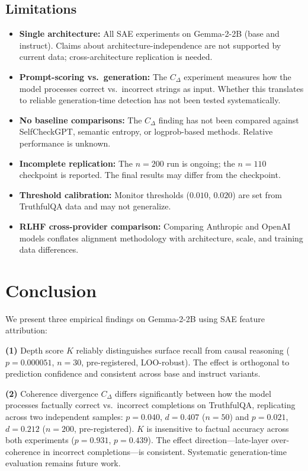 \documentclass[10pt]{article}
\begin{document}
\subsection{Limitations}

\begin{itemize}
    \item \textbf{Single architecture:} All SAE experiments on Gemma-2-2B (base and instruct). Claims about architecture-independence are not supported by current data; cross-architecture replication is needed.
    \item \textbf{Prompt-scoring vs.\ generation:} The $C_{\Delta}$ experiment measures how the model processes correct vs.\ incorrect strings as input. Whether this translates to reliable generation-time detection has not been tested systematically.
    \item \textbf{No baseline comparisons:} The $C_{\Delta}$ finding has not been compared against SelfCheckGPT, semantic entropy, or logprob-based methods. Relative performance is unknown.
    \item \textbf{Incomplete replication:} The $n{=}200$ run is ongoing; the $n{=}110$ checkpoint is reported. The final results may differ from the checkpoint.
    \item \textbf{Threshold calibration:} Monitor thresholds ($0.010$, $0.020$) are set from TruthfulQA data and may not generalize.
    \item \textbf{RLHF cross-provider comparison:} Comparing Anthropic and OpenAI models conflates alignment methodology with architecture, scale, and training data differences.
\end{itemize}

\section{Conclusion}

We present three empirical findings on Gemma-2-2B using SAE feature attribution:

\textbf{(1)} Depth score $K$ reliably distinguishes surface recall from causal reasoning ($p = 0.000051$, $n = 30$, pre-registered, LOO-robust). The effect is orthogonal to prediction confidence and consistent across base and instruct variants.

\textbf{(2)} Coherence divergence $C_{\Delta}$ differs significantly between how the model processes factually correct vs.\ incorrect completions on TruthfulQA, replicating across two independent samples: $p = 0.040$, $d = 0.407$ ($n = 50$) and $p = 0.021$, $d = 0.212$ ($n = 200$, pre-registered). $K$ is insensitive to factual accuracy across both experiments ($p = 0.931$, $p = 0.439$). The effect direction---late-layer over-coherence in incorrect completions---is consistent. Systematic generation-time evaluation remains future work.
\end{document}
